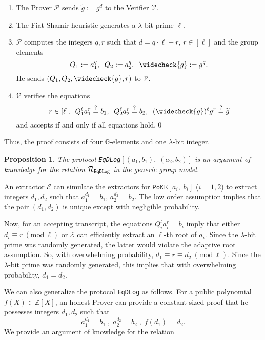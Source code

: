 \documentclass[11pt, lettersize, notitlepage, leqno, footskip=0.6cm]{article}
\newcommand{\bz}{\mathbb Z}
\newcommand{\ttt}{\texttt}
\newcommand{\wti}{\widetilde}
\newcommand{\mc}{\mathcal}
\newcommand{\mb}{\mathbb}
\newcommand{\lam}{\lambda}
\newcommand{\lamb}{\lambda}
\newcommand{\weck}{\widecheck}
\newcommand{\vs}{\vspace{-0.15cm}}
\newcommand{\noin}{\noindent}
\newcommand{\op}{overwhelming probability}
\newcommand{\np}{negligible probability}
\newcommand{\sta}{\stackrel{?}{=}}
\newcommand{\Mod}[1]{\ (\mathrm{mod}\ #1)}
\newcommand{\E}{\mc{E}}
\newtheorem{Prop}[Thm]{Proposition}
\numberwithin{equation}{section}
\begin{document}
\begin{enumerate}[wide, labelwidth=!, labelindent=0pt]\vs \item The Prover $\mc{P}$ sends $\wti{g} := g^d$ to the Verifier $\mc{V}$. \vs

\item The Fiat-Shamir heuristic generates a $\lamb$-bit prime $\ell$. \vs

\item $\mc{P}$ computes the integers $q, r$ such that $d = q \cdot \ell+r$, $r\in [\ell]$ and the group elements \vs $$Q_1:= a_1^q,\;\; Q_2:= a_2^q,\;\; \weck{g}:= g^q.$$ He sends $(Q_1, Q_2, \weck{g}, r)$ to $\mc{V}$. \vs

\item $\mc{V}$ verifies the equations \vs $$r\in [\ell],\;\;Q_1^{\ell}a_1^r \sta  b_1, \;\; Q_2^{\ell}a_2^r \sta  b_2, \;\; (\weck{g})^{\ell}g^r \sta \wti{g}$$ and accepts if and only if all equations hold.\qed \end{enumerate}

\noin Thus, the proof consists of four $\mb{G}$-elements and one $\lam$-bit integer. 

\begin{Prop} The protocol \verb|EqDLog|$[(a_1, b_1),\; (a_2, b_2)]$ is an argument of knowledge for the relation $\mc{R}_{{\tt{{EqDLog}}}}$ in the generic group model.\end{Prop}

\begin{prf} An extractor $\E$ can simulate the extractors for $\ttt{PoKE}[a_i,\;b_i]$ ($i=1,2$) to extract integers $d_1,d_2$ such that $a_1^{d_1} = b_1$, $a_2^{d_2} = b_2$. The \hyperlink{low order}{low order assumption} implies that the pair $(d_1,d_2)$ is unique except with \np. 

Now, for an accepting transcript, the equations $Q_i^{l}a_i^{r} = b_i$ imply that either $d_i\equiv r\Mod{\ell}$ or $\E$ can efficiently extract an $\ell$-th root of $a_i$. Since the $\lam$-bit prime was randomly generated, the latter would violate the adaptive root assumption. So, with \op, $d_1\equiv r\equiv d_2\Mod{\ell}$. Since the $\lam$-bit prime was randomly generated, this implies that with \op, $d_1 = d_2$.\end{prf}

\vspace{0.2cm}



\noindent We can also generalize the protocol \verb|EqDLog| as follows. For a public polynomial {$f(X)\in \bz[X]$}, an honest Prover can provide a constant-sized proof that he possesses integers $d_1,d_2$ such that \vs $$a_1^{d_1} = b_1\;,\;a_2^{d_2} = b_2\;,\;f(d_1) = d_2.$$ We provide an argument of knowledge for the relation 
\end{document}
